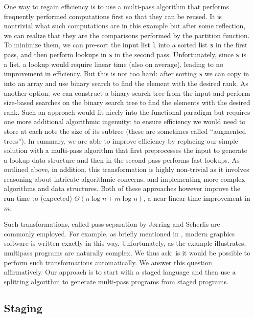 \begin{abstrsyn}
One way to regain efficiency is to use a multi-pass algorithm that
performs frequently performed computations first so that they can be
reused.  It is nontrivial what such computations are in this example
but after some reflection, we can realize that they are the
comparisons performed by the partition function.  To minimize them, we
can pre-sort the input list \texttt{l} into a sorted list \texttt{s}
in the first pass, and then perform lookups in \texttt{s} in the
second pass.  Unfortunately, since \texttt{s} is a list, a lookup
would require linear time (also on average), leading to no improvement
in efficiency.  But this is not too hard: after sorting \texttt{s} we
can copy in into an array and use binary search to find the element
with the desired rank.  As another option, we can construct a binary
search tree from the input and perform size-based searches on the
binary search tree to find the elements with the desired rank.  Such
an approach would fit nicely into the functional paradigm but requires
one more additional algorithmic ingenuity: to ensure efficiency we
would need to store at each note the size of its subtree (these are
sometimes called ``augmented trees'').  In summary, we are able to
improve efficiency by replacing our simple solution with a multi-pass
algorithm that first preprocesses the input to generate a lookup data
structure and then in the second pass performs fast lookups.  As
outlined above, in addition, this transformation is highly non-trivial
as it involves reasoning about intricate algorithmic concerns, and
implementing more complex algorithms and data structures.  Both of
these approaches however improve the run-time to (expected)
$\Theta(n\log{n} + m\log{n})$, a near linear-time improvement in $m$.

Such transformations, called pass-separation by J{\o}rring and
Scherlis are commonly employed.  For example, as briefly mentioned in
, modern graphics software is written exactly in this
way.  Unfortunately, as the example illustrates, multipass programs
are naturally complex.  We thus ask: is it would be possible to
perform such transformations automatically.  We answer this question
affirmatively.  Our approach is to start with a staged language and
then use a splitting algorithm to generate multi-pass programs from
staged programs.


\subsection{Staging}


\end{abstrsyn}
